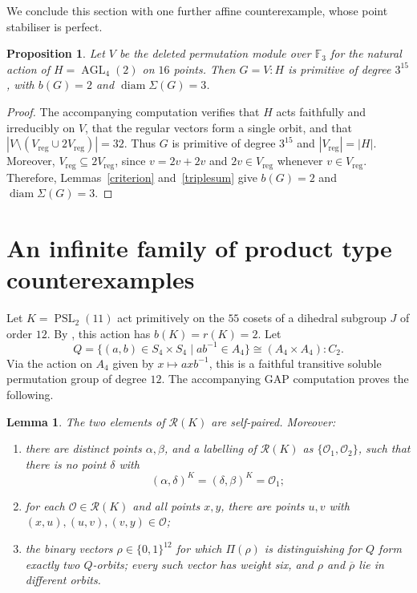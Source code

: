 \documentclass[a4paper,reqno,11pt]{amsart}
\newcommand\F{\mathbb{F}}
\newcommand\AGL{\operatorname{AGL}}
\newcommand\diam{\operatorname{diam}}
\newtheorem{prop}[thm]{Proposition}
\newtheorem{lem}[thm]{Lemma}
\numberwithin{equation}{section}
\begin{document}
We conclude this section with one further affine counterexample, whose point stabiliser is perfect.

\begin{prop}\label{prop:perfect}
Let $V$ be the deleted permutation module over $\F_3$ for the natural action of $H=\AGL_4(2)$ on $16$ points. Then $G=V{:}H$ is primitive of degree $3^{15}$, with $b(G)=2$ and $\diam\Sigma(G)=3$. 
\end{prop}

\begin{proof}
The accompanying computation \cite{AlunaAdam} verifies that $H$ acts faithfully and irreducibly on $V$, that the regular vectors form a single orbit, and that $|V\setminus(V_{\mathrm{reg}} \cup 2V_{\mathrm{reg}})|=32$. Thus $G$ is primitive of degree $3^{15}$ and $|V_{\mathrm{reg}}|=|H|$. Moreover, $V_{\mathrm{reg}}\subseteq2V_{\mathrm{reg}}$, since $v=2v+2v$ and $2v\in V_{\mathrm{reg}}$ whenever $v\in V_{\mathrm{reg}}$. Therefore, Lemmas~\ref{criterion} and~\ref{triplesum} give $b(G)=2$ and $\diam\Sigma(G)=3$.
\end{proof}


\section{An infinite family of product type counterexamples} \label{sec:product}

Let $K=\operatorname{PSL}_2(11)$ act primitively on the $55$ cosets of a dihedral subgroup $J$ of order $12$. By \cite[Table~4]{BH}, this action has $b(K)=r(K)=2$. Let
\[
Q=\{(a,b)\in S_4\times S_4 \mid  ab^{-1}\in A_4\}
\cong(A_4\times A_4){:}C_2.
\]
Via the action on $A_4$ given by $x\mapsto axb^{-1}$, this is a faithful transitive soluble permutation group of degree $12$. The accompanying GAP computation proves the following.

\begin{lem}\label{productinput}
The two elements of $\mathcal R(K)$ are self-paired. Moreover:
\begin{enumerate}
\item[{(i)}] there are distinct points $\alpha,\beta$, and a labelling of $\mathcal R(K)$ as $\{\mathcal O_1,\mathcal O_2\}$, such that there is no point $\delta$ with
\[
(\alpha,\delta)^K=(\delta,\beta)^K=\mathcal O_1;
\]
\item[{(ii)}] for each $\mathcal O\in\mathcal R(K)$ and all points $x,y$, there are points $u,v$ with $(x,u),(u,v),(v,y)\in\mathcal O$;
\item[{(iii)}] the binary vectors $\rho\in\{0,1\}^{12}$ for which $\Pi(\rho)$ is distinguishing for $Q$ form exactly two $Q$-orbits; every such vector has weight six, and $\rho$ and $\overline\rho$ lie in different orbits.
\end{enumerate}
\end{lem}
\end{document}
